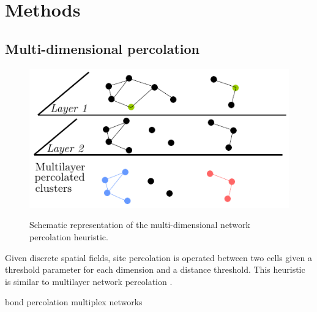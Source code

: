 \documentclass{jimis-en}
\begin{document}
\section{Methods}




\subsection{Multi-dimensional percolation}


\begin{figure}[ht] 
  {\includegraphics[width=\linewidth]{figures/principle.pdf}}
  \centering
  \label{fig:method}
  \caption{Schematic representation of the multi-dimensional network percolation heuristic.}
\end{figure}



Given discrete spatial fields, site percolation is operated between two cells given a threshold parameter for each dimension and a distance threshold. This heuristic is similar to multilayer network percolation \citep{boccaletti2014structure}.

\cite{son2012percolation} %

\cite{hackett2016bond} bond percolation multiplex networks

\end{document}
